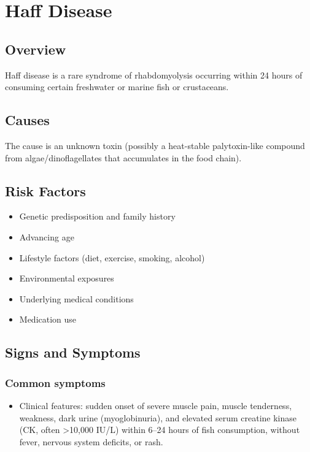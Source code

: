 \chapter{Haff Disease}
\label{sec:Haff Disease}

\section{Overview}
Haff disease is a rare syndrome of rhabdomyolysis occurring within 24 hours of consuming certain freshwater or marine fish or crustaceans.
\section{Causes}
The cause is an unknown toxin (possibly a heat-stable palytoxin-like compound from algae/dinoflagellates that accumulates in the food chain).     
\section{Risk Factors}

\begin{itemize}[noitemsep]
  \item Genetic predisposition and family history
  \item Advancing age
  \item Lifestyle factors (diet, exercise, smoking, alcohol)
  \item Environmental exposures
  \item Underlying medical conditions
  \item Medication use
\end{itemize}
\section{Signs and Symptoms}

\subsection{Common symptoms}
\begin{itemize}[noitemsep]
  \item Clinical features: sudden onset of severe muscle pain, muscle tenderness, weakness, dark urine (myoglobinuria), and elevated serum creatine kinase (CK, often >10,000 IU/L) within 6--24 hours of fish consumption, without fever, nervous system deficits, or rash. 
  \end{itemize}

